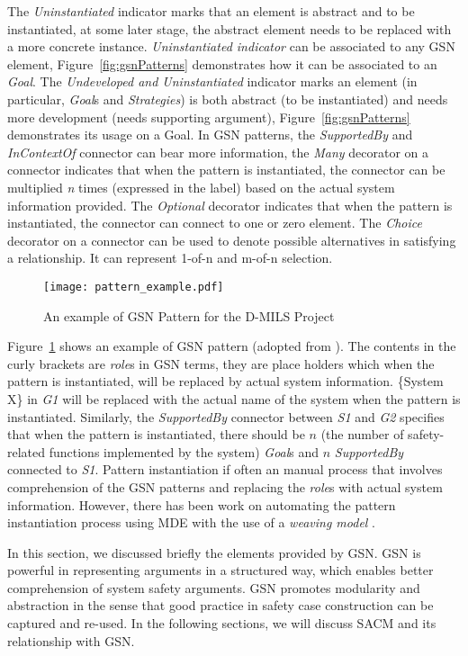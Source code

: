 The \textit{Uninstantiated} indicator marks that an element is abstract and to be instantiated, at some later stage, the abstract element needs to be replaced with a more concrete instance. \textit{Uninstantiated indicator} can be associated to any GSN element, Figure~\ref{fig:gsnPatterns} demonstrates how it can be associated to an \textit{Goal}. The \textit{Undeveloped and Uninstantiated} indicator marks an element (in particular, \textit{Goal}s and \textit{Strategies}) is both abstract (to be instantiated) and needs more development (needs supporting argument), Figure~\ref{fig:gsnPatterns} demonstrates its usage on a Goal. In GSN patterns, the \textit{SupportedBy} and \textit{InContextOf} connector can bear more information, the \textit{Many} decorator on a connector indicates that when the pattern is instantiated, the connector can be multiplied \textit{n} times (expressed in the label) based on the actual system information provided. The \textit{Optional} decorator indicates that when the pattern is instantiated, the connector can connect to one or zero element. The \textit{Choice} decorator on a connector can be used to denote possible alternatives in satisfying a relationship. It can represent 1-of-n and m-of-n selection. 

\begin{figure}[ht!]
	\centering
	\texttt{[image: pattern\_example.pdf]}
	\caption{An example of GSN Pattern for the D-MILS Project \cite{}}
	\label{fig:dmilsPattern}
\end{figure}

Figure~\ref{fig:dmilsPattern} shows an example of GSN pattern (adopted from \cite{kelly1997safety}). The contents in the curly brackets are \textit{role}s in GSN terms, they are place holders which when the pattern is instantiated, will be replaced by actual system information.  \{System X\} in \textit{G1} will be replaced with the actual name of the system when the pattern is instantiated. Similarly, the \textit{SupportedBy} connector between \textit{S1} and \textit{G2} specifies that when the pattern is instantiated, there should be $n$ (the number of safety-related functions implemented by the system) \textit{Goal}s and $n$ \textit{SupportedBy} connected to \textit{S1}. Pattern instantiation if often an manual process that involves comprehension of the GSN patterns and replacing the \textit{role}s with actual system information. However, there has been work on automating the pattern instantiation process using MDE with the use of a \textit{weaving model} \cite{hawkins2015weaving}. 

In this section, we discussed briefly the elements provided by GSN. GSN is powerful in representing arguments in a structured way, which enables better comprehension of system safety arguments. GSN promotes modularity and abstraction in the sense that good practice in safety case construction can be captured and re-used. In the following sections, we will discuss SACM and its relationship with GSN. 